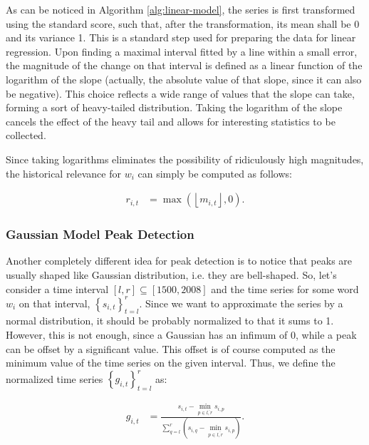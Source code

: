 As can be noticed in Algorithm \autoref{alg:linear-model}, the series is first transformed using the standard score, such that, after the transformation, its mean shall be 0 and its variance 1. This is a standard step used for preparing the data for linear regression. Upon finding a maximal interval fitted by a line within a small error, the magnitude of the change on that interval is defined as a linear function of the logarithm of the slope (actually, the absolute value of that slope, since it can also be negative). This choice reflects a wide range of values that the slope can take, forming a sort of heavy-tailed distribution. Taking the logarithm of the slope cancels the effect of the heavy tail and allows for interesting statistics to be collected.

Since taking logarithms eliminates the possibility of ridiculously high magnitudes, the historical relevance for $w_i$ can simply be computed as follows:

\begin{align}
\label{eq:linear-model-relevance}
r_{i, t} &= \max \left( \left\lfloor m_{i, t} \right\rfloor, 0 \right).
\end{align}

\subsubsection{Gaussian Model Peak Detection}

Another completely different idea for peak detection is to notice that peaks are usually shaped like Gaussian distribution, i.e. they are bell-shaped. So, let's consider a time interval $\left[ l, r \right] \subseteq \left[ 1500, 2008 \right]$ and the time series for some word $w_i$ on that interval, $\left\{ s_{i, t} \right\}_{t=l}^{r}$. Since we want to approximate the series by a normal distribution, it should be probably normalized to that it sums to 1. However, this is not enough, since a Gaussian has an infimum of 0, while a peak can be offset by a significant value. This offset is of course computed as the minimum value of the time series on the given interval. Thus, we define the normalized time series $\left\{ g_{i, t} \right\}_{t=l}^{r}$ as:

\begin{align}
\label{eq:gaussian-normalization}
g_{i, t} &= \frac{s_{i, t} - \min_{p \in \overline{l, r}} s_{i, p}}{\sum_{q = l}^{r} \left( s_{i, q} - \min_{p \in \overline{l, r}} s_{i, p} \right)}.
\end{align}

